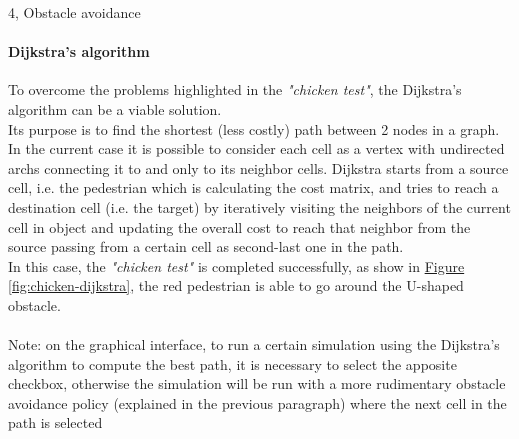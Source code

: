 \documentclass[10pt,a4paper]{article}
\begin{document}
\begin{task}{4, Obstacle avoidance}
\paragraph{Dijkstra's algorithm}
To overcome the problems highlighted in the \textit{"chicken test"}, the Dijkstra's algorithm can be a viable solution.\\
Its purpose is to find the shortest (less costly) path between 2 nodes in a graph.
In the current case it is possible to consider each cell as a vertex with undirected archs connecting it to and only to its neighbor cells.
Dijkstra starts from a source cell, i.e. the pedestrian which is calculating the cost matrix, and tries to reach a destination cell (i.e. the target) by iteratively visiting the neighbors of the current cell in object and updating the overall cost to reach that neighbor from the source passing from a certain cell as second-last one in the path.\\
In this case, the \textit{"chicken test"} is completed successfully, as show in \hyperref[fig:chicken-dijkstra]{Figure \ref{fig:chicken-dijkstra}}, the red pedestrian is able to go around the U-shaped obstacle.\\\\
Note: on the graphical interface, to run a certain simulation using the Dijkstra's algorithm to compute the best path, it is necessary to select the apposite checkbox, otherwise the simulation will be run with a more rudimentary obstacle avoidance policy (explained in the previous paragraph) where the next cell in the path is selected 


\end{task}
\end{document}
